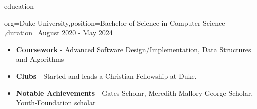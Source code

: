 \documentclass{resume}
\begin{document}
%
\pagebreak
\makeheader

\newcommand{\skill}[2]{\textbf{#1} - #2}

\begin{ResumeSection}{education}
    \begin{ResumeSubsection}{org={Duke University},position={Bachelor of Science in Computer Science}
        ,duration={August 2020 - May 2024}}
        \begin{itemize}
            \item \skill{Coursework}{
                    Advanced Software Design/Implementation, 
                     Data Structures and Algorithms
            }
            \item \skill{Clubs}{Started and leads a Christian
                Fellowship at Duke.}
            \item \skill{Notable Achievements}{Gates Scholar, Meredith Mallory
                George Scholar, Youth-Foundation scholar}
        \end{itemize}
    \end{ResumeSubsection}
\end{ResumeSection}
\end{document}
